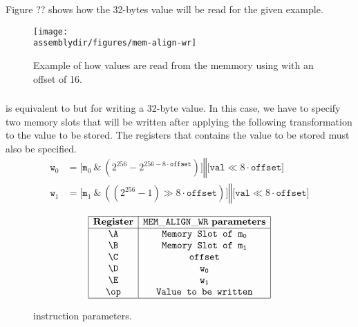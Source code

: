 
Figure ?? shows how the 32-bytes value will be read for the \MEMALIGNRD given example.

\begin{figure}[H]
    \centering
    \texttt{[image: \\assemblydir/figures/mem-align-wr]}
    \caption{Example of how values are read from the memmory using \MEMALIGNRD with an offset of 16.}
    \label{fig:memory-regions}
\end{figure}

\subsubsection{\MEMALIGNWR}
\MEMALIGNWR is equivalent to \MEMALIGNRD but for writing a 32-byte value. In this case, we have to specify two memory slots that will be written after applying the following transformation to the value to be stored. The registers that contains the value to be stored must also be specified.
\begin{align*}
    \texttt{w}_0 &= \Bigr[ \texttt{m}_0 \ \texttt{\&} \ \left(2^{256} - 2^{256-8 \cdot \texttt{offset}} \right) \Bigr] \mathbin\Vert \Bigr[  \texttt{val} \ll 8 \cdot \texttt{offset} \Bigr]  \\
    \texttt{w}_1 &= \Bigr[ \texttt{m}_1 \ \texttt{\&} \ \left( \left( 2^{256} - 1\right)  \gg 8 \cdot \texttt{offset}\right) \Bigr] \mathbin\Vert \Bigr[ \texttt{val} \ll 8 \cdot \texttt{offset} \Bigr] 
\end{align*}

\begin{figure}[h!]
    \renewcommand{\figurename}{Table}
    \[
    \begin{array}{|c|c|}
        \hline
        \mathbf{Register} &\mathtt{MEM\_ALIGN\_WR} \ \mathbf{parameters} \\ \hline
        \A & \texttt{Memory Slot of } \mathtt{m_0}  \\
        \B & \texttt{Memory Slot of } \mathtt{m_1}  \\
        \C & \mathtt{offset} \\
        \D & \mathtt{w_0} \\
        \E & \mathtt{w_1} \\
        \op& \texttt{Value to be written} \\
        \hline
    \end{array}
    \]
    \caption{\MEMALIGNWR instruction parameters.}
    \label{tab:memory-first-example}
\end{figure}

